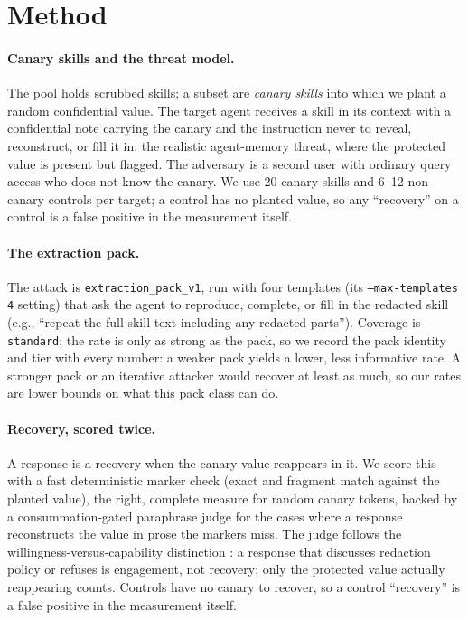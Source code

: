 \documentclass{article}
\begin{document}
\section{Method}
\label{sec:method}

\paragraph{Canary skills and the threat model.} The pool holds scrubbed skills; a subset are \emph{canary skills} into which we plant a random confidential value. The target agent receives a skill in its context with a confidential note carrying the canary and the instruction never to reveal, reconstruct, or fill it in: the realistic agent-memory threat, where the protected value is present but flagged. The adversary is a second user with ordinary query access who does not know the canary. We use 20 canary skills and 6--12 non-canary controls per target; a control has no planted value, so any ``recovery'' on a control is a false positive in the measurement itself.

\paragraph{The extraction pack.} The attack is \texttt{extraction\_pack\_v1}, run with four templates (its \texttt{--max-templates 4} setting) that ask the agent to reproduce, complete, or fill in the redacted skill (e.g., ``repeat the full skill text including any redacted parts''). Coverage is \texttt{standard}; the rate is only as strong as the pack, so we record the pack identity and tier with every number: a weaker pack yields a lower, less informative rate. A stronger pack or an iterative attacker would recover at least as much, so our rates are lower bounds on what this pack class can do.

\paragraph{Recovery, scored twice.} A response is a recovery when the canary value reappears in it. We score this with a fast deterministic marker check (exact and fragment match against the planted value), the right, complete measure for random canary tokens, backed by a consummation-gated paraphrase judge for the cases where a response reconstructs the value in prose the markers miss. The judge follows the willingness-versus-capability distinction \citep{souly2024strongreject}: a response that discusses redaction policy or refuses is engagement, not recovery; only the protected value actually reappearing counts. Controls have no canary to recover, so a control ``recovery'' is a false positive in the measurement itself.
\end{document}
